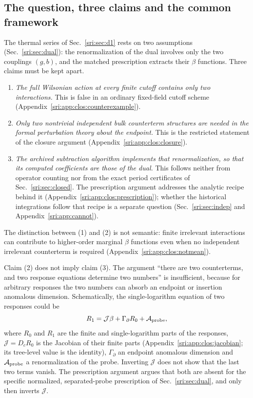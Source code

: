 \subsection{The question, three claims and the common framework}\label{sri:app:clos:question}
The thermal series of Sec.~\ref{sri:sec:d1} rests on two assumptions (Sec.~\ref{sri:sec:dual}): the renormalization of the dual
involves only the two couplings $(g,b)$, and the matched prescription extracts their $\beta$ functions. Three claims
must be kept apart.
\begin{enumerate}[label=(\arabic*),leftmargin=2em]
\item \emph{The full Wilsonian action at every finite cutoff contains only two interactions.} This is false in an
 ordinary fixed-field cutoff scheme (Appendix~\ref{sri:app:clos:counterexample}).
\item \emph{Only two nontrivial independent bulk counterterm structures are needed in the formal perturbation theory
 about the endpoint.} This is the restricted statement of the closure argument (Appendix~\ref{sri:app:clos:closure}).
\item \emph{The archived subtraction algorithm implements that renormalization, so that its computed coefficients are
 those of the dual.} This follows neither from operator counting nor from the exact period certificates of
 Sec.~\ref{sri:sec:closed}. The prescription argument addresses the analytic recipe behind it
 (Appendix~\ref{sri:app:clos:prescription}); whether the historical integrations follow that recipe is a separate question
 (Sec.~\ref{sri:sec:indep} and Appendix~\ref{sri:app:cannot}).
\end{enumerate}
The distinction between (1) and (2) is not semantic: finite irrelevant interactions can contribute to higher-order
marginal $\beta$ functions even when no independent irrelevant counterterm is required
(Appendix~\ref{sri:app:clos:notmean}).

Claim (2) does not imply claim (3). The argument ``there are two counterterms, and two response equations determine
two numbers'' is insufficient, because for arbitrary responses the two numbers can absorb an endpoint or insertion
anomalous dimension. Schematically, the single-logarithm equation of two responses could be
\begin{equation}
 R_1=\mathcal J\beta+\Gamma_\partial R_0+\mathcal A_{\rm probe},
 \label{sri:eq:clos:anomaly}
\end{equation}
where $R_0$ and $R_1$ are the finite and single-logarithm parts of the responses, $\mathcal J=D_cR_0$ is the
Jacobian of their finite parts (Appendix~\ref{sri:app:clos:jacobian}; its tree-level value is the identity), $\Gamma_\partial$ an endpoint anomalous dimension and $\mathcal A_{\rm probe}$ a renormalization of the
probe. Inverting $\mathcal J$ does not show that the last two terms vanish. The prescription argument argues that both
are absent for the specific normalized, separated-probe prescription of Sec.~\ref{sri:sec:dual}, and only then inverts
$\mathcal J$.

